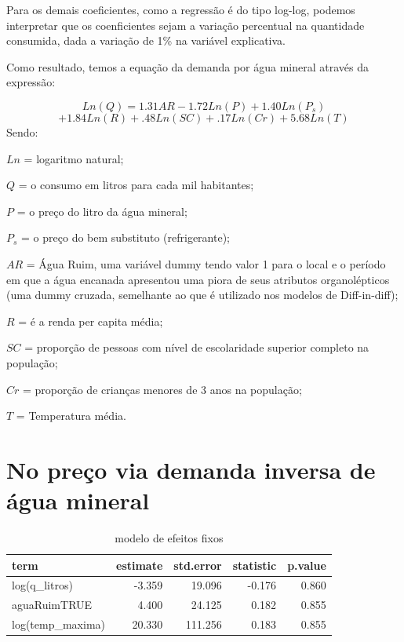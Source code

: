 \documentclass[
  12pt,
]{book}
\begin{document}
Para os demais coeficientes, como a regressão é do tipo log-log, podemos interpretar que os coenficientes sejam a variação percentual na quantidade consumida, dada a variação de 1\% na variável explicativa.

Como resultado, temos a equação da demanda por água mineral através da expressão:

\[ Ln(Q) = 1.31AR -1.72Ln(P) + 1.40Ln(P_{s})\]
\[+ 1.84Ln(R) + .48Ln(SC) + .17Ln(Cr) + 5.68Ln(T)\]
Sendo:

\(Ln\) = logaritmo natural;

\(Q\) = o consumo em litros para cada mil habitantes;

\(P\) = o preço do litro da água mineral;

\(P_{s}\) = o preço do bem substituto (refrigerante);

\(AR\) = Água Ruim, uma variável dummy tendo valor 1 para o local e o período em que a água encanada apresentou uma piora de seus atributos organolépticos (uma dummy cruzada, semelhante ao que é utilizado nos modelos de Diff-in-diff);

\(R\) = é a renda per capita média;

\(SC\) = proporção de pessoas com nível de escolaridade superior completo na população;

\(Cr\) = proporção de crianças menores de 3 anos na população;

\(T\) = Temperatura média.

\hypertarget{no-preuxe7o-via-demanda-inversa-de-uxe1gua-mineral}{%
\section{No preço via demanda inversa de água mineral}\label{no-preuxe7o-via-demanda-inversa-de-uxe1gua-mineral}}

\begin{table}

\caption{\label{tab:orientador2}modelo de efeitos fixos}
\centering
\begin{tabular}[t]{l|r|r|r|r}
\hline
term & estimate & std.error & statistic & p.value\\
\hline
log(q\_litros) & -3.359 & 19.096 & -0.176 & 0.860\\
\hline
aguaRuimTRUE & 4.400 & 24.125 & 0.182 & 0.855\\
\hline
log(temp\_maxima) & 20.330 & 111.256 & 0.183 & 0.855\\
\hline
\end{tabular}
\end{table}
\end{document}
